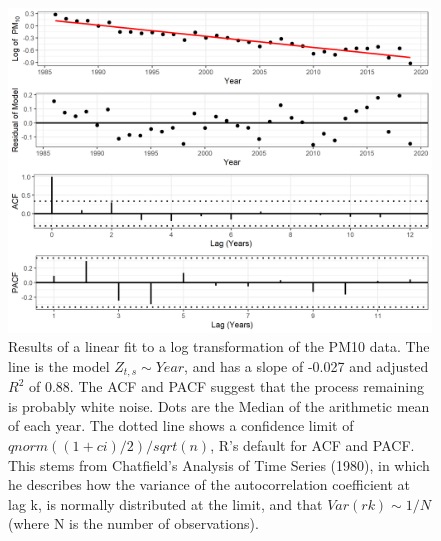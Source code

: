 \documentclass{article}
\begin{document}
\begin{figure}[ht]
    \centering
    \includegraphics[width = \textwidth]{Figures/explore_ts_exp_fit.png}
    \caption{Results of a linear fit to a log transformation of the \ac{PM10} data.  The line is the model $Z_{t,s} \sim Year$, and has a slope of -0.027 and adjusted $R^2$ of 0.88.  The \ac{ACF} and \ac{PACF} suggest that the process remaining is probably white noise.  Dots are the Median of the arithmetic mean of each year.  The dotted line shows a confidence limit of $qnorm((1 + ci)/2)/sqrt(n)$, R's default for ACF and PACF.  This stems from Chatfield's Analysis of Time Series (1980), in which he describes how the variance of the autocorrelation coefficient at lag k, is normally distributed at the limit, and that $Var(rk) \sim 1/N$ (where N is the number of observations).}
    \label{fig:explore_ts_exp_fit}
\end{figure}
\end{document}
